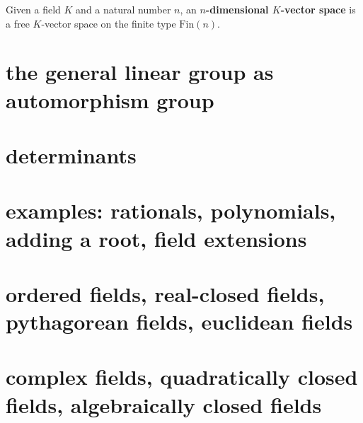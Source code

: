 \begin{definition}
Given a field $K$ and a natural number $n$, an \textbf{$n$-dimensional $K$-vector space} is a free $K$-vector space on the finite type $\mathrm{Fin}(n)$. 
\end{definition}

\section{the general linear group as automorphism group}
\section{determinants\titledagger}
\section{examples: rationals, polynomials, adding a root, field extensions}
\section{ordered fields, real-closed fields, pythagorean fields, euclidean fields}
\section{complex fields, quadratically closed fields, algebraically closed fields}

